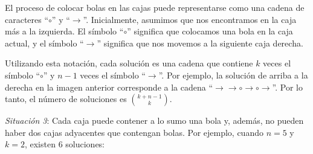 \begin{center}
\end{center}

El proceso de colocar bolas en las cajas puede representarse como una cadena
de caracteres ``$\circ$'' y ``$\rightarrow$''. Inicialmente, asumimos que nos
encontramos en la caja más a la izquierda. El símbolo ``$\circ$'' significa que
colocamos una bola en la caja actual, y el símbolo ``$\rightarrow$'' significa
que nos movemos a la siguiente caja derecha.

Utilizando esta notación, cada solución es una cadena que contiene $k$
veces el símbolo ``$\circ$'' y $n-1$ veces el símbolo ``$\rightarrow$''.
Por ejemplo, la solución de arriba a la derecha en la imagen anterior
corresponde a la cadena
``$\rightarrow \rightarrow \circ \rightarrow \circ \rightarrow$''.
Por lo tanto, el número de soluciones es $\binom{k+n-1}{k}$.

\textit{Situación 3}: Cada caja puede contener a lo sumo una bola y, además,
no pueden haber dos cajas adyacentes que contengan bolas. Por ejemplo, cuando
$n=5$ y $k=2$, existen 6 soluciones:

